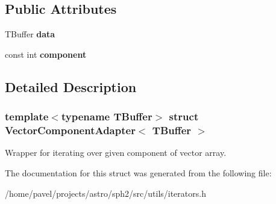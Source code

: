 \subsection*{Public Attributes}
\begin{DoxyCompactItemize}
\item 
\hypertarget{structVectorComponentAdapter_a91c42662ba5ff8008af9547acf6f2840}{}\label{structVectorComponentAdapter_a91c42662ba5ff8008af9547acf6f2840} 
T\+Buffer {\bfseries data}
\item 
\hypertarget{structVectorComponentAdapter_af85eaf27bae110975a52b1c174f1bfc3}{}\label{structVectorComponentAdapter_af85eaf27bae110975a52b1c174f1bfc3} 
const int {\bfseries component}
\end{DoxyCompactItemize}


\subsection{Detailed Description}
\subsubsection*{template$<$typename T\+Buffer$>$\newline
struct Vector\+Component\+Adapter$<$ T\+Buffer $>$}

Wrapper for iterating over given component of vector array. 

The documentation for this struct was generated from the following file\+:\begin{DoxyCompactItemize}
\item 
/home/pavel/projects/astro/sph2/src/utils/iterators.\+h\end{DoxyCompactItemize}
